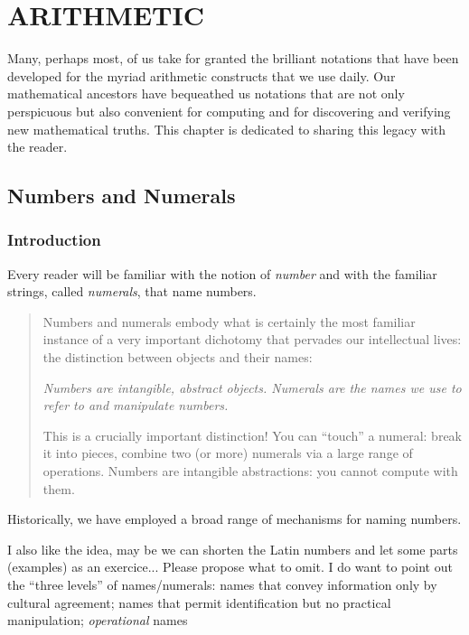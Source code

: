 
\chapter{ARITHMETIC}
\label{ch:arithmetic}

Many, perhaps most, of us take for granted the brilliant notations
that have been developed for the myriad arithmetic constructs that we
use daily.  Our mathematical ancestors have bequeathed us notations
that are not only perspicuous but also convenient for computing and
for discovering and verifying new mathematical truths.  This chapter
is dedicated to sharing this legacy with the reader.

\section{Numbers and Numerals}
\label{sec:numbers-numerals}

\subsection{Introduction}

Every reader will be familiar with the notion of {\it number} and with
the familiar strings, called {\it numerals}, that name numbers.
\begin{quote}
Numbers and numerals embody what is certainly the most familiar
instance of a very important dichotomy that pervades our intellectual
lives: the distinction between objects and their names:

{\em Numbers are intangible, abstract objects.  Numerals are the names
  we use to refer to and manipulate numbers.}

This is a crucially important distinction!  You can ``touch'' a
numeral: break it into pieces, combine two (or more) numerals via a
large range of operations.  Numbers are intangible abstractions: you
cannot compute with them.
\end{quote}
Historically, we have employed a broad range of mechanisms for naming
numbers.

{\Denis I also like the idea, may be we can shorten the Latin numbers
  and let some parts (examples) as an exercice...}
{\Arny Please propose what to omit.  I do want to point out the
  ``three levels'' of names/numerals: names that convey information
  only by cultural agreement; names that permit identification but no
  practical manipulation; {\em operational} names}

